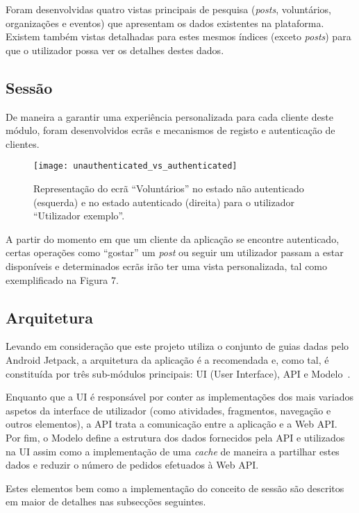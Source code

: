 Foram desenvolvidas quatro vistas principais de pesquisa (\textit{posts}, voluntários, organizações e eventos) que apresentam os dados existentes na plataforma. Existem também vistas detalhadas para estes mesmos índices (exceto \textit{posts}) para que o utilizador possa ver os detalhes destes dados.

\subsection{Sessão}

De maneira a garantir uma experiência personalizada para cada cliente deste módulo, foram desenvolvidos ecrãs e mecanismos de registo e autenticação de clientes.

\begin{figure}[h]
	\centering
	\texttt{[image: unauthenticated\_vs\_authenticated]}
	\caption{Representação do ecrã ``Voluntários'' no estado não autenticado (esquerda) e no estado autenticado (direita) para o utilizador ``Utilizador exemplo''.}
\end{figure}

A partir do momento em que um cliente da aplicação se encontre autenticado, certas operações como ``gostar'' um \textit{post} ou seguir um utilizador passam a estar disponíveis e determinados ecrãs irão ter uma vista personalizada, tal como exemplificado na Figura 7.

\subsection{Arquitetura}

Levando em consideração que este projeto utiliza o conjunto de guias dadas pelo Android Jetpack,
a arquitetura da aplicação é a recomendada e, como tal, é constituída por três sub-módulos principais: UI (User Interface), API e Modelo~\cite{AndroidJetpack2020}.

\medskip

Enquanto que a UI é responsável por conter as implementações dos mais variados aspetos da interface de utilizador (como atividades, fragmentos, navegação e outros elementos), a API trata a comunicação entre a aplicação e a Web API. Por fim, o Modelo define a estrutura dos dados fornecidos pela API e utilizados na UI assim como a implementação de uma \textit{cache} de maneira a partilhar estes dados e reduzir o número de pedidos efetuados à Web API. 

\medskip

Estes elementos bem como a implementação do conceito de sessão são descritos em maior de detalhes nas subsecções seguintes.

